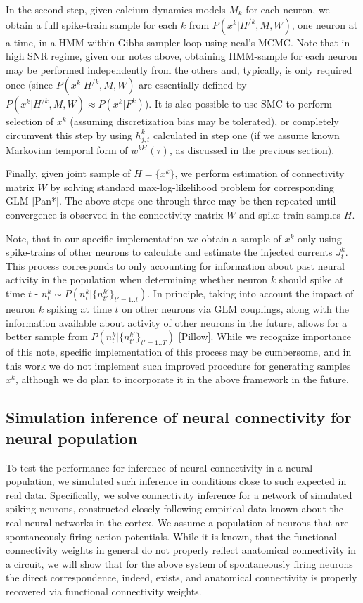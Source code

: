 \documentclass[amsmath,amssymb]{revtex4}
\begin{document}
In the second step, given calcium dynamics models $M_k$ for each neuron, we obtain a full spike-train sample for each $k$ from $P(x^k|H^{/k},M,W)$, one neuron at a time, in a HMM-within-Gibbs-sampler loop using neal's MCMC. Note that in high SNR regime, given our notes above, obtaining HMM-sample for each neuron may be performed independently from the others and, typically, is only required once (since $P(x^k|H^{/k},M,W)$ are essentially defined by  $P(x^k|H^{/k},M,W)\approx P(x^k|F^k)$). It is also possible to use SMC to perform selection of $x^k$ (assuming discretization bias may be tolerated), or completely circumvent this step by using $h^k_{j,t}$ calculated in step one (if we assume known Markovian temporal form of $w^{kk'}(\tau)$, as discussed in the previous section).

Finally, given joint sample of $H=\{x^k\}$, we perform estimation of connectivity matrix $W$ by solving standard max-log-likelihood problem for corresponding GLM [Pan*]. The above steps one through three may be then repeated until convergence is observed in the connectivity matrix $W$ and spike-train samples $H$.

Note, that in our specific implementation we obtain a sample of $x^k$ only using spike-trains of other neurons to calculate and estimate the injected currents $J^k_t$. This process corresponds to only accounting for information about past neural activity in the population when determining whether neuron $k$ should spike at time $t$ - $n^k_t \sim P(n^k_t|\{n^{k'}_{t'}\}_{t'=1..t})$. In principle, taking into account the impact of neuron $k$ spiking at time $t$ on other neurons via GLM couplings, along with the information available about activity of other neurons in the future, allows for a better sample from $P(n^k_t|\{n^{k'}_{t'}\}_{t'=1..T})$ [Pillow]. While we recognize importance of this note, specific implementation of this process may be cumbersome, and in this work we do not implement such improved procedure for generating samples $x^k$, although we do plan to incorporate it in the above framework in the future.



\subsection{\label{sec:methods:simulations}Simulation inference of neural connectivity for neural population}
To test the performance for inference of neural connectivity in a neural population, we simulated such inference in conditions close to such expected in real data.
Specifically, we solve connectivity inference for a network of simulated spiking neurons, constructed closely following empirical data known about the real neural networks in the cortex. We assume a population of neurons that are spontaneously firing action potentials.
While it is known, that the functional connectivity weights in general do not properly reflect anatomical connectivity in a circuit, we will show that for the above system of spontaneously firing neurons the direct correspondence, indeed, exists, and anatomical connectivity is properly recovered via functional connectivity weights.
\end{document}
